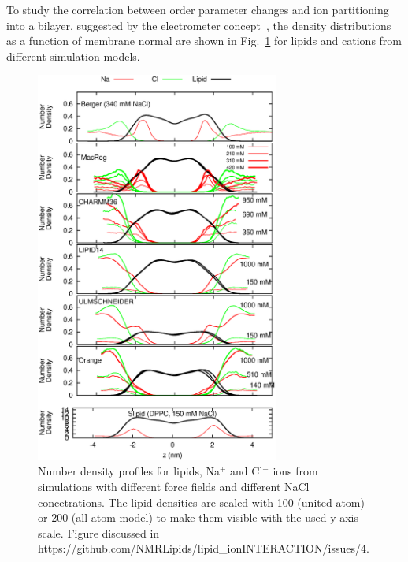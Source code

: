\documentclass[pre,aps,floatfix,authordate1-4,twocolumn]{revtex4-1}
\begin{document}
To study the correlation between order parameter changes and ion partitioning into a bilayer, 
suggested by the electrometer concept~\cite{akutsu81,altenbach84,seelig87,scherer89}, the density distributions as a function of membrane normal 
are shown in Fig.~\ref{IONdensCOMP} for lipids and cations from different simulation models. 
\begin{figure}[]
  \centering
  \includegraphics[width=8cm]{../Fig/NAdensities.eps}
  \caption{\label{IONdensCOMP}
    Number density profiles for lipids, Na$^+$ and Cl$^-$ ions from simulations with different force fields and different NaCl concetrations. 
    The lipid densities are scaled with 100 (united atom) or 200 (all atom model) to make them visible with the used y-axis scale.
    Figure discussed in https://github.com/NMRLipids/lipid\_ionINTERACTION/issues/4.
  }
\end{figure}
\end{document}
